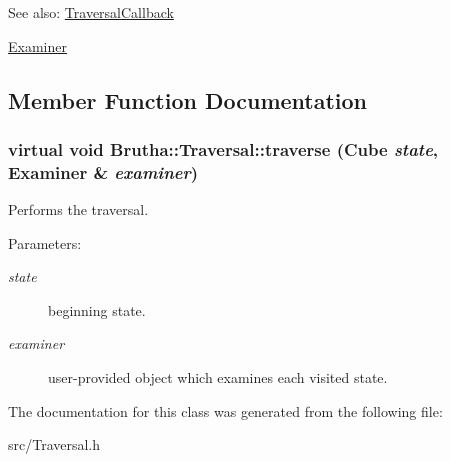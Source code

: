 \begin{Desc}
\item[See also:]\hyperlink{classBrutha_1_1TraversalCallback}{TraversalCallback} 

\hyperlink{classBrutha_1_1Examiner}{Examiner} \end{Desc}


\subsection{Member Function Documentation}
\hypertarget{classBrutha_1_1Traversal_67ab6c006a71670a85bf44e402929d01}{
\subsubsection[{traverse}]{\setlength{\rightskip}{0pt plus 5cm}virtual void Brutha::Traversal::traverse (Cube {\em state}, \/  {\bf Examiner} \& {\em examiner})}}
\label{classBrutha_1_1Traversal_67ab6c006a71670a85bf44e402929d01}


Performs the traversal. 

\begin{Desc}
\item[Parameters:]
\begin{description}
\item[{\em state}]beginning state. \item[{\em examiner}]user-provided object which examines each visited state. \end{description}
\end{Desc}


The documentation for this class was generated from the following file:\begin{CompactItemize}
\item 
src/Traversal.h\end{CompactItemize}
